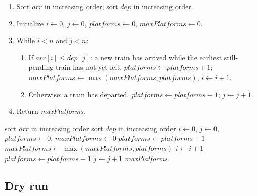 \begin{enumerate}
  \item Sort $\textit{arr}$ in increasing order; sort $\textit{dep}$ in
        increasing order.
  \item Initialize $i \gets 0$, $j \gets 0$, $\textit{platforms} \gets 0$,
        $\textit{maxPlatforms} \gets 0$.
  \item While $i < n$ and $j < n$:
  \begin{enumerate}
    \item If $\textit{arr}[i] \le \textit{dep}[j]$: a new train has
          arrived while the earliest still-pending train has not yet left.
          $\textit{platforms} \gets \textit{platforms}+1$;
          $\textit{maxPlatforms} \gets \max(\textit{maxPlatforms},
          \textit{platforms})$; $i \gets i+1$.
    \item Otherwise: a train has departed.
          $\textit{platforms} \gets \textit{platforms}-1$; $j \gets j+1$.
  \end{enumerate}
  \item Return \textit{maxPlatforms}.
\end{enumerate}

\begin{algorithm}[H]
\caption{Minimum Platforms}
\begin{algorithmic}[1]
  \State sort $\textit{arr}$ in increasing order
  \State sort $\textit{dep}$ in increasing order
  \State $i \gets 0$, $j \gets 0$, $\textit{platforms} \gets 0$, $\textit{maxPlatforms} \gets 0$
      \State $\textit{platforms} \gets \textit{platforms} + 1$
      \State $\textit{maxPlatforms} \gets \max(\textit{maxPlatforms}, \textit{platforms})$
      \State $i \gets i + 1$
    \Else
      \State $\textit{platforms} \gets \textit{platforms} - 1$
      \State $j \gets j + 1$
    \EndIf
  \EndWhile
  \State \Return \textit{maxPlatforms}
\EndProcedure
\end{algorithmic}
\end{algorithm}

\subsection*{Dry run}



